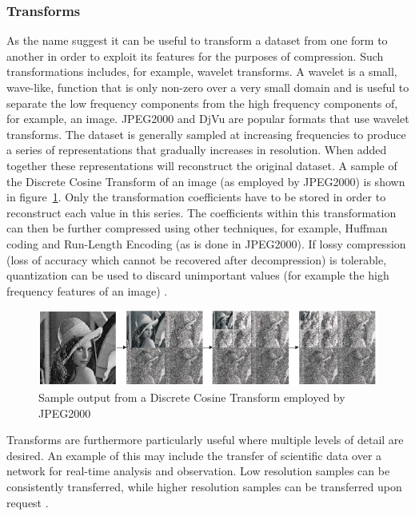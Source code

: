 \subsubsection{Transforms}
As the name suggest it can be useful to transform a dataset from one form to another in order to exploit its features for the purposes of compression. Such transformations 
includes, for example, wavelet transforms. A wavelet is a small, wave-like, function that is only non-zero over a very small domain and is useful
to separate the low frequency components from the high frequency components of, for example, an image. JPEG2000 and DjVu are popular formats that use 
wavelet transforms. The dataset is generally sampled at increasing frequencies to produce a series of representations that gradually increases in resolution. When added together 
these representations will reconstruct the original dataset. A sample of the Discrete Cosine Transform of an image (as employed by JPEG2000) is shown in figure~\ref{TRANSFORM_SAMPLE}. 
Only the transformation coefficients have to be stored in order to reconstruct each value in this series. The coefficients within this transformation can then be further compressed 
using other techniques, for example, Huffman coding and Run-Length Encoding (as is done in JPEG2000). If lossy compression (loss of accuracy which cannot be recovered after 
decompression) is tolerable, quantization can be used to discard unimportant values (for example the high frequency features of an image) \cite{952804}\cite[ch. 5]{salomon2004data}.
\begin{figure}[h!]
 \centering
 \includegraphics[width=1.0\textwidth]{DCTSample.png}
 \caption{Sample output from a Discrete Cosine Transform employed by JPEG2000 \cite{952804}}
 \label{TRANSFORM_SAMPLE}
\end{figure}

Transforms are furthermore particularly useful where multiple levels of detail are desired. An example of this may include the transfer of scientific data over a network 
for real-time analysis and observation. Low resolution samples can be consistently transferred, while higher resolution samples can be transferred upon request \cite{Tao:1994:PTS:951087.951108}.
